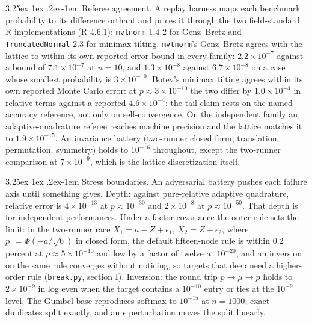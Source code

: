 \documentclass[11pt]{article}
\makeatletter
\renewcommand\paragraph{\@startsection{paragraph}{4}{\z@}%
  {3.25ex \@plus1ex \@minus.2ex}{-1em}%
  {\normalfont\normalsize\itshape}}
\makeatother
\begin{document}
\paragraph{Referee agreement.} A replay harness maps each benchmark
probability to its difference orthant and prices it through the two
field-standard R implementations (R 4.6.1): \texttt{mvtnorm} 1.4-2 for
Genz--Bretz and \texttt{TruncatedNormal} 2.3 for minimax tilting.
\texttt{mvtnorm}'s Genz--Bretz agrees with
the lattice to within its own reported error bound in every family:
$2.2\times10^{-7}$ against a bound of $7.1\times10^{-7}$ at $n=10$, and
$1.3\times10^{-8}$ against $6.7\times10^{-8}$ on a case whose smallest
probability is $3\times10^{-10}$. Botev's minimax tilting agrees within its own
reported Monte Carlo error: at $p\approx3\times10^{-10}$ the two differ by
$1.0\times10^{-4}$ in relative terms against a reported $4.6\times10^{-4}$: the tail claim rests on the named accuracy
reference, not only on self-convergence. On the independent family an
adaptive-quadrature referee reaches machine precision and the lattice matches
it to $1.9\times10^{-15}$. An invariance battery (two-runner closed form,
translation, permutation, symmetry) holds to $10^{-16}$ throughout, except
the two-runner comparison at $7\times10^{-9}$, which is the lattice
discretization itself.

\paragraph{Stress boundaries.} An adversarial battery pushes each failure
axis until something gives. Depth: against pure-relative adaptive
quadrature, relative error is $4\times10^{-13}$ at $p\approx10^{-30}$ and
$2\times10^{-8}$ at $p\approx10^{-50}$. That depth is for independent performances. Under a factor
covariance the outer rule sets the limit: in the two-runner race
$X_1=a-Z+\epsilon_1$, $X_2=Z+\epsilon_2$, where $p_1=\Phi(-a/\sqrt6)$ in closed
form, the default fifteen-node rule is within $0.2$ percent at
$p\approx5\times10^{-10}$ and low by a factor of twelve at $10^{-20}$, and an
inversion on the same rule converges without noticing, so targets that
deep need a higher-order rule (\texttt{break.py}, section I).
Inversion: the round trip $p\to\mu\to p$ holds to $2\times10^{-9}$ in log even when
the target contains a $10^{-10}$ entry or ties at the $10^{-9}$ level. The
Gumbel base reproduces softmax to $10^{-15}$ at $n=1000$; exact duplicates
split exactly, and an $\epsilon$ perturbation moves the split linearly.
\end{document}
